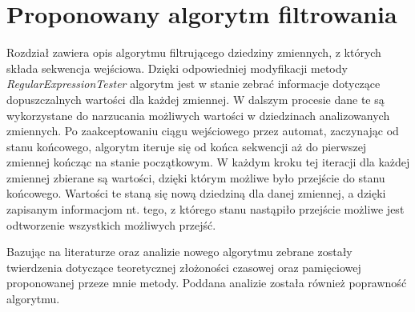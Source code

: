 \chapter{Proponowany algorytm filtrowania}
\thispagestyle{chapterBeginStyle}
\par
Rozdział zawiera opis algorytmu filtrującego dziedziny zmiennych, z których składa sekwencja wejściowa. Dzięki odpowiedniej
modyfikacji metody \textit{RegularExpressionTester} algorytm jest w stanie zebrać informacje dotyczące dopuszczalnych wartości
dla każdej zmiennej. W dalszym procesie dane te są wykorzystane do narzucania możliwych wartości w dziedzinach analizowanych
zmiennych. Po zaakceptowaniu ciągu wejściowego przez automat, zaczynając od stanu końcowego, algorytm iteruje się od końca
sekwencji aż do pierwszej zmiennej kończąc na stanie początkowym. W każdym kroku tej iteracji dla każdej zmiennej zbierane
są wartości, dzięki którym możliwe było przejście do stanu końcowego. Wartości te staną się nową dziedziną dla danej zmiennej,
a dzięki zapisanym informacjom nt. tego, z którego stanu nastąpiło przejście możliwe jest odtworzenie wszystkich możliwych przejść.
\par
Bazując na literaturze oraz analizie nowego algorytmu zebrane zostały twierdzenia dotyczące teoretycznej złożoności czasowej oraz
pamięciowej proponowanej przeze mnie metody. Poddana analizie została również poprawność algorytmu.

